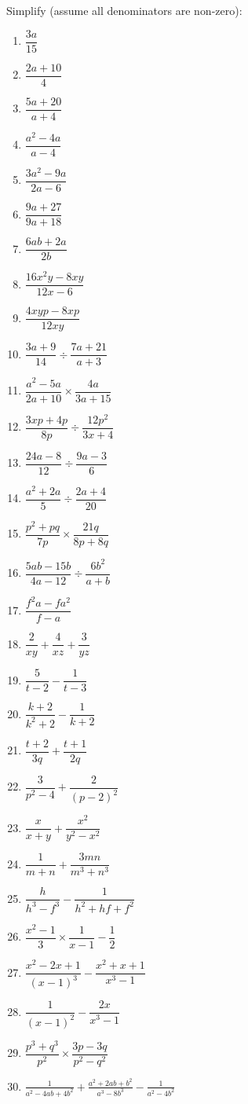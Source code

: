 \begin{exercises}{}
{
Simplify (assume all denominators are non-zero):
\begin{multicols}{2}
\begin{enumerate}[itemsep=5pt, label=\textbf{\arabic*}. ] 
\item$\dfrac{3a}{15}$
\item $\dfrac{2a+10}{4}$
\item $\dfrac{5a+20}{a+4}$
\item $\dfrac{{a}^{2}-4a}{a-4}$
\item $\dfrac{3{a}^{2}-9a}{2a-6}$
\item $\dfrac{9a+27}{9a+18}$
\item $\dfrac{6ab+2a}{2b}$
\item $\dfrac{16{x}^{2}y-8xy}{12x-6}$
\item $\dfrac{4xyp-8xp}{12xy}$
\item $\dfrac{3a+9}{14}÷\dfrac{7a+21}{a+3}$
\item $\dfrac{{a}^{2}-5a}{2a+10} \times \dfrac{4a}{3a+15}$
\item $\dfrac{3xp+4p}{8p}÷\dfrac{12{p}^{2}}{3x+4}$
\item $\dfrac{24a-8}{12}÷\dfrac{9a-3}{6}$
\item $\dfrac{{a}^{2}+2a}{5}÷\dfrac{2a+4}{20}$
\item $\dfrac{{p}^{2}+pq}{7p} \times \dfrac{21q}{8p+8q}$
\item $\dfrac{5ab-15b}{4a-12}÷\dfrac{6{b}^{2}}{a+b}$
\item $\dfrac{{f}^{2}a-f{a}^{2}}{f-a}$
\item $\dfrac{2}{xy} + \dfrac{4}{xz}+\dfrac{3}{yz}$
\item $\dfrac{5}{t-2} - \dfrac{1}{t-3}$
\item $\dfrac{k+2}{k^{2} +2} - \dfrac{1}{k+2}$
\item $\dfrac{t+2}{3q} + \dfrac{t+1}{2q}$
\item $\dfrac{3}{p^{2}-4}+\dfrac{2}{(p-2)^{2}}$
\item $\dfrac{x}{x+y}+\dfrac{x^{2}}{y^{2} - x^{2}}$
\item $\dfrac{1}{m+n} + \dfrac{3mn}{m^{3} + n^{3}}$
\item $\dfrac{h}{h^{3}-f^{3}} - \dfrac{1}{h^{2} + hf + f^{2}}$
\item $\dfrac{{x}^{2}-1}{3}\times\dfrac{1}{x-1}-\dfrac{1}{2}$
\item  $\dfrac{x^2-2x+1}{(x-1)^3} - \dfrac{x^2+x+1}{x^3-1}$
\item $\dfrac{1}{(x-1)^2} - \dfrac{2x}{x^3-1}$
\item $\dfrac{p^3 + q^3}{p^2} \times \dfrac{3p-3q}{p^2-q^2}$
\item $\frac{1}{a^2-4ab+4b^2} + \frac{a^2+2ab+b^2}{a^3-8b^3} - \frac{1}{a^2-4b^2}$
\end{enumerate}
\end{multicols}

}
\end{exercises}

